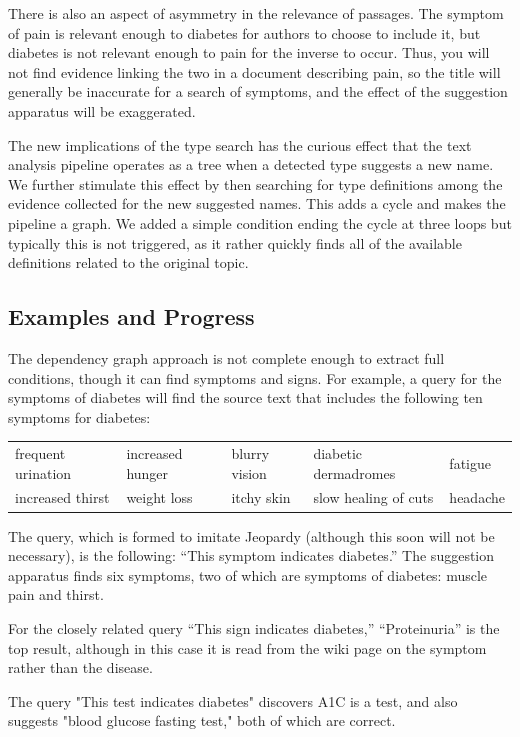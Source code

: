 \documentclass[12pt,letterpaper]{article}
\begin{document}
There is also an aspect of asymmetry in the relevance of passages. The symptom of pain is relevant enough to diabetes for authors to choose to include it, but diabetes is not relevant enough to pain for the inverse to occur. Thus, you will not find evidence linking the two in a document describing pain, so the title will generally be inaccurate for a search of symptoms, and the effect of the suggestion apparatus will be exaggerated.

The new implications of the type search has the curious effect that the text analysis pipeline operates as a tree when a detected type suggests a new name. We further stimulate this effect by then searching for type definitions among the evidence collected for the new suggested names. This adds a cycle and makes the pipeline a graph. We added a simple condition ending the cycle at three loops but typically this is not triggered, as it rather quickly finds all of the available definitions related to the original topic.

\subsection{Examples and Progress}
The dependency graph approach is not complete enough to extract full conditions, though it can find symptoms and signs. For example, a query for the symptoms of diabetes will find the source text that includes the following ten symptoms for diabetes:

\medskip
\begin{tabular}{lllll}
frequent urination & increased hunger & blurry vision & 
diabetic dermadromes & fatigue \\
increased thirst & weight loss & itchy skin & slow healing of cuts & headache  \\
\end{tabular}
\medskip

The query, which is formed to imitate Jeopardy (although this soon will not be necessary), is the following: ``This symptom indicates 
diabetes.'' The suggestion apparatus finds six symptoms, two of which are symptoms of diabetes: muscle pain and thirst.

For the closely related query ``This sign indicates diabetes,'' ``Proteinuria'' is the top result, although in this case it is read from the wiki page on the symptom rather than the disease.

The query "This test indicates diabetes" discovers A1C is a test, and also suggests "blood glucose fasting test," both of which are correct.
\end{document}
